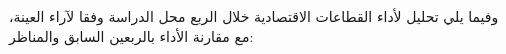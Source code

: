 وفيما يلي تحليل لأداء القطاعات الاقتصادية خلال الربع محل الدراسة وفقا لآراء العينة، مع مقارنة الأداء بالربعين السابق والمناظر:
